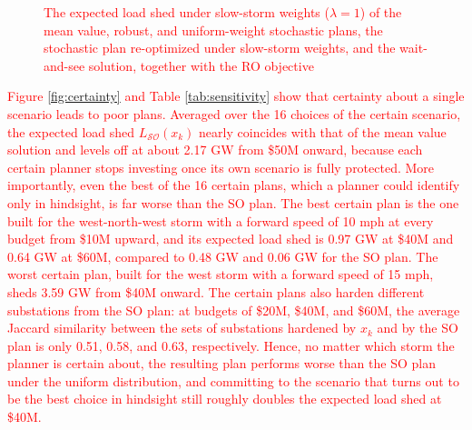 \documentclass[authoryear,preprint,review,12pt]{elsarticle}\usepackage{amssymb}
\begin{document}
\begin{figure}[htbp]
    \centering
    \begin{minipage}[t]{0.45\textwidth}
        \centering
        \caption{\textcolor{red}{The expected load shed of plans built assuming certainty about a single scenario, evaluated under the uniform distribution over all 16 scenarios (mean over the 16 choices of the certain scenario, with the band showing the best and worst choices), compared with the mean value, stochastic, and wait-and-see solutions}}
        \label{fig:certainty}
    \end{minipage}
    \hfill
    \begin{minipage}[t]{0.45\textwidth}
        \centering
        \caption{\textcolor{red}{The expected load shed under slow-storm weights ($\lambda=1$) of the mean value, robust, and uniform-weight stochastic plans, the stochastic plan re-optimized under slow-storm weights, and the wait-and-see solution, together with the RO objective}}
        \label{fig:slow_storm}
    \end{minipage}
\end{figure}

\textcolor{red}{Figure \ref{fig:certainty} and Table \ref{tab:sensitivity} show that certainty about a single scenario leads to poor plans. Averaged over the 16 choices of the certain scenario, the expected load shed $L_{\mathcal{SO}}(x_k)$ nearly coincides with that of the mean value solution and levels off at about 2.17 GW from \$50M onward, because each certain planner stops investing once its own scenario is fully protected. More importantly, even the best of the 16 certain plans, which a planner could identify only in hindsight, is far worse than the SO plan. The best certain plan is the one built for the west-north-west storm with a forward speed of 10 mph at every budget from \$10M upward, and its expected load shed is 0.97 GW at \$40M and 0.64 GW at \$60M, compared to 0.48 GW and 0.06 GW for the SO plan. The worst certain plan, built for the west storm with a forward speed of 15 mph, sheds 3.59 GW from \$40M onward. The certain plans also harden different substations from the SO plan: at budgets of \$20M, \$40M, and \$60M, the average Jaccard similarity between the sets of substations hardened by $x_k$ and by the SO plan is only 0.51, 0.58, and 0.63, respectively. Hence, no matter which storm the planner is certain about, the resulting plan performs worse than the SO plan under the uniform distribution, and committing to the scenario that turns out to be the best choice in hindsight still roughly doubles the expected load shed at \$40M.}
\end{document}

